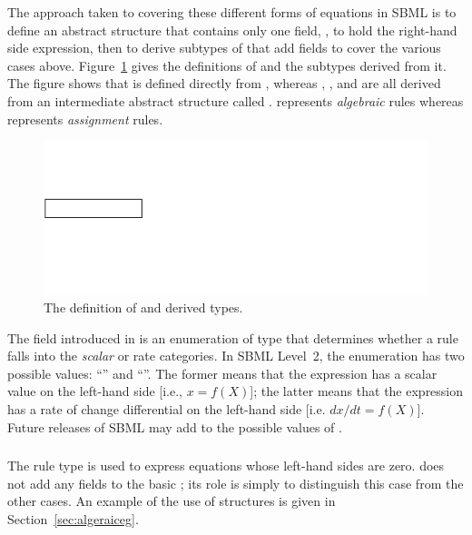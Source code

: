 \documentclass[10pt,twocolumntoc]{cekarticle}
\newcommand{\vref}[1]{\ref{#1}}
\begin{document}
The approach taken to covering these different forms of equations in SBML
is to define an abstract  structure that contains only one
field, , to hold the right-hand side expression, then to
derive subtypes of  that add fields to cover the various cases
above.  Figure~\vref{fig:rules} gives the definitions of  and
the subtypes derived from it.  The figure shows that 
is defined directly from , whereas
, , and
 are all derived from an intermediate abstract
structure called .   represents
\emph{algebraic} rules whereas  represents
\emph{assignment} rules.

\begin{figure}[htb]
  \centering
  \includegraphics[scale = 0.68]{rule}
  \caption{The definition of  and derived types.}
  \label{fig:rules}
\end{figure}

The  field introduced in  is an
enumeration of type  that determines whether a
rule falls into the \emph{scalar} or {rate} categories. In
SBML Level~2, the enumeration has two possible values:
``'' and ``''.  The former means that
the expression has a scalar value on the left-hand side [i.e., $x
= f(X)$]; the latter means that
the expression has a rate of change differential on the left-hand
side [i.e. $dx/dt = f(X)$]. Future releases of SBML may
add to the possible values of .


\subsubsection{}

The rule type  is used to express equations
whose left-hand sides are zero.   does not
add any fields to the basic ; its role is simply to
distinguish this case from the other cases.  An example of the use
of  structures is given in
Section~\ref{sec:algeraiceg}.
\end{document}

